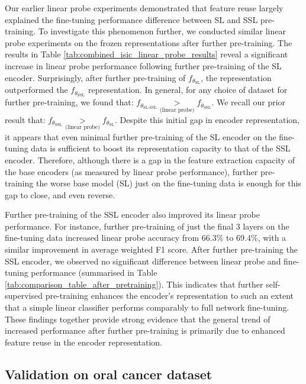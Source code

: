 \documentclass[a4paper,fleqn]{cas-dc}
\begin{document}
Our earlier linear probe experiments demonstrated that feature reuse largely explained the fine-tuning performance difference between SL and SSL pre-training. To investigate this phenomenon further, we conducted similar linear probe experiments on the frozen representations after further pre-training. The results in Table \ref{tab:combined_isic_linear_probe_results} reveal  a significant increase in linear probe performance following further pre-training of the SL encoder. Surprisingly, after further pre-training of $f_{\theta_{\scriptscriptstyle\text{SL}}}$, the representation outperformed the $f_{\theta_{\scriptscriptstyle\text{SSL}}}$ representation. In general, for any choice of dataset for further pre-training,   we found   that: %
$f_{\theta_{\scriptscriptstyle\text{SL-SSL}}}\underset{\scriptscriptstyle\text{(linear probe)}}{>} f_{\theta_{\scriptscriptstyle\text{SSL}}}$.
We recall our prior result that: $f_{\theta_{\scriptscriptstyle\text{SSL}}}\underset{\scriptscriptstyle\text{(linear probe)}}{>} f_{\theta_{\scriptscriptstyle\text{SL}}}$. Despite this initial gap in encoder representation, it appears that even minimal further pre-training of the SL encoder on the fine-tuning data is sufficient to boost its representation capacity to that of the SSL encoder. Therefore, although there is a gap in the feature extraction capacity of the base encoders (as measured by linear probe performance), further pre-training the worse base model  (SL) just on the fine-tuning data is enough for this gap to close, and even reverse. 

Further pre-training of the SSL encoder also improved its linear probe performance. For instance, further pre-training of just the final 3 layers on the fine-tuning data increased linear probe accuracy from 66.3\% to 69.4\%, with a similar improvement in average weighted F1 score. After further pre-training the SSL encoder, we observed no significant difference between linear probe and fine-tuning performance (summarised in Table \ref{tab:comparison_table_after_pretraining}). This indicates that further self-supervised pre-training enhances the encoder's representation to such an extent that a simple linear classifier performs comparably to full network fine-tuning. These findings together provide strong evidence that the general trend of increased performance after further pre-training is primarily due to enhanced feature reuse in the encoder representation. 

\subsection{Validation on oral cancer dataset}
\end{document}
